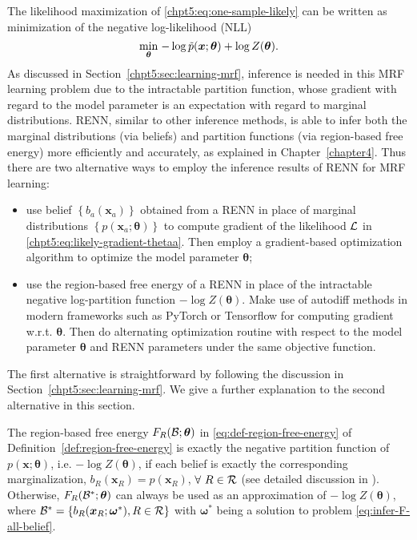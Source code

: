 The likelihood maximization of \eqref{chpt5:eq:one-sample-likely} can be written as minimization of the negative log-likelihood (NLL)
\begin{equation}\label{eq:maximizing-likelihood}
  \underset{\bm{\theta}}{\min}\;{ -\log{\tilde{p}(\bm{x}; \bm{\theta})} + \log{Z(\bm{\theta})}}.
\end{equation}
As discussed in Section~\ref{chpt5:sec:learning-mrf}, inference is needed in this MRF learning problem due to the intractable partition function, whose gradient with regard to the model parameter is an expectation with regard to marginal distributions. RENN, similar to other inference methods, is able to infer both the marginal distributions (via beliefs) and partition functions (via region-based free energy) more efficiently and accurately, as explained in Chapter~\ref{chapter4}. Thus there are two alternative ways to employ the inference results of RENN for MRF learning:
\begin{itemize}
\item use belief $\left\{ b_{a}(\bm{x}_a) \right\}$ obtained from a RENN in place of marginal distributions $\left\{ p(\bm{x}_a; \bm{\theta}) \right\}$ to compute gradient of the likelihood $\mathcal{L}$ in \eqref{chpt5:eq:likely-gradient-thetaa}. Then employ a gradient-based optimization algorithm to optimize the model parameter $\bm{\theta}$;
  \item use the region-based free energy of a RENN in place of the intractable negative log-partition function $-\log{Z(\bm{\theta})}$. Make use of autodiff methods in modern frameworks such as PyTorch \cite{pytorch} or Tensorflow \cite{tensorflow} for computing gradient w.r.t. $\bm{\theta}$. Then do alternating optimization routine with respect to the model parameter $\bm{\theta}$ and RENN parameters under the same objective function.
\end{itemize}
The first alternative is straightforward by following the discussion in Section~\ref{chpt5:sec:learning-mrf}. We give a further explanation to the second alternative in this section.

The region-based free energy $F_R(\mathcal{B};\bm{\theta})$ in \eqref{eq:def-region-free-energy} of Definition~\ref{def:region-free-energy} is exactly the negative partition function of $p(\bm{x};\bm{\theta})$, i.e. $-\log{Z(\bm{\theta})}$, if each belief is exactly the corresponding marginalization, $b_R(\bm{x}_R)=p(\bm{x}_{R})$, $\forall~R\in \mathcal{R}$ (see detailed discussion in \cite{yedida2005constucting}). Otherwise, $F_R(\mathcal{B}^{\ast};\bm{\theta})$ can always be used as an approximation of $-\log{Z(\bm{\theta})}$, where $\mathcal{B}^{\ast}= \{b_R(\bm{x}_R; \bm{\omega}^{\ast}), R\in \mathcal{R}\}$ with $\bm{\omega}^{\ast}$ being a solution to problem \eqref{eq:infer-F-all-belief}.

